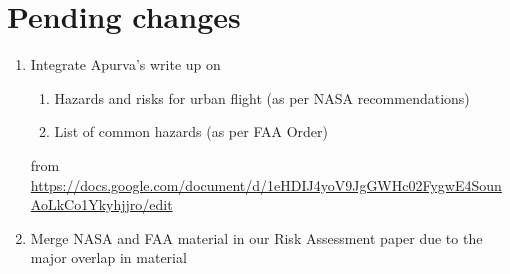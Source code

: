 \documentclass{ua_wgs_base}
\begin{document}
\section{Pending changes}

\begin{enumerate}

	\item Integrate Apurva's write up on
	\begin{enumerate}
		\item Hazards and risks for urban flight (as per NASA recommendations)
		\item List of common hazards (as per FAA Order)
	\end{enumerate}
from \href{doc}{https://docs.google.com/document/d/1eHDIJ4yoV9JgGWHc02FygwE4SounAoLkCo1Ykyhjjro/edit}
\item Merge NASA and FAA material in our Risk Assessment paper due to the major overlap in material

\end{enumerate}



\end{document}
